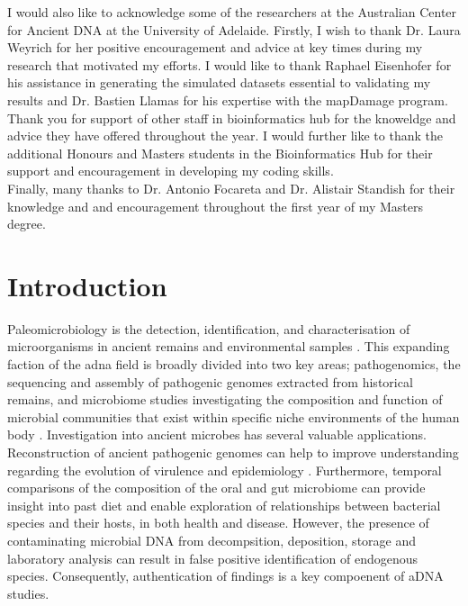 \documentclass[12pt, a4paper]{article}
\begin{document}
I would also like to acknowledge some of the researchers at the Australian Center for Ancient DNA at the University of Adelaide. Firstly, I wish to thank Dr. Laura Weyrich for her positive encouragement and advice at key times during my research that motivated my efforts. I would like to thank Raphael Eisenhofer for his assistance in generating the simulated datasets essential to validating my results and Dr. Bastien Llamas for his expertise with the mapDamage program.\\

Thank you for support of other staff in bioinformatics hub for the knoweldge and advice they have offered throughout the year. I would further like to thank the additional Honours and Masters students in the Bioinformatics Hub for their support and encouragement in developing my coding skills.\\

Finally, many thanks to Dr. Antonio Focareta and Dr. Alistair Standish for their knowledge and and encouragement throughout the first year of my Masters degree. 



\newpage

\setcounter{page}{1} %

\section{Introduction}\label{sec:intro}


Paleomicrobiology is the detection, identification, and characterisation of microorganisms in ancient remains and environmental samples \cite{Drancourt:2005aa}. 
This expanding faction of the \gls{adna} field is broadly divided into two key areas; \gls{pathogenomics}, the sequencing and assembly of pathogenic genomes extracted from historical remains, and \gls{microbiome} studies investigating the composition and function of microbial communities that exist within specific niche environments of the human body \cite{Lederberg:2001}.
Investigation into ancient microbes has several valuable applications.
Reconstruction of ancient pathogenic genomes can help to improve understanding regarding the evolution of virulence and epidemiology \cite{Bos:2011aa,Kay:2014aa}.
Furthermore, temporal comparisons of the composition of the oral \cite{Adler:2013aa,Warinner:2014aa} and gut microbiome \cite{Tito:2012aa,Lugli:2017aa} can provide insight into past diet and enable exploration of relationships between bacterial species and their hosts, in both health and disease. 
However, the presence of contaminating microbial DNA from decompsition, deposition, storage and laboratory analysis can result in false positive identification of endogenous species. 
Consequently, authentication of findings is a key compoenent of aDNA studies.
\end{document}

